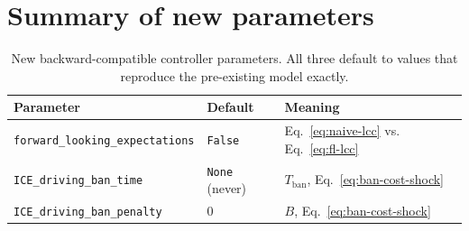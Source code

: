 \documentclass[11pt]{article}
\newcommand{\code}[1]{\texttt{#1}}
\begin{document}
\section{Summary of new parameters}

\begin{table}[h]
\centering
\begin{tabular}{@{}lll@{}}
\toprule
Parameter & Default & Meaning \\
\midrule
\code{forward\_looking\_expectations} & \code{False} & Eq.~\eqref{eq:naive-lcc} vs. Eq.~\eqref{eq:fl-lcc} \\
\code{ICE\_driving\_ban\_time} & \code{None} (never) & $T_{\mathrm{ban}}$, Eq.~\eqref{eq:ban-cost-shock} \\
\code{ICE\_driving\_ban\_penalty} & $0$ & $B$, Eq.~\eqref{eq:ban-cost-shock} \\
\bottomrule
\end{tabular}
\caption{New backward-compatible controller parameters. All three default
to values that reproduce the pre-existing model exactly.}
\end{table}
\end{document}
